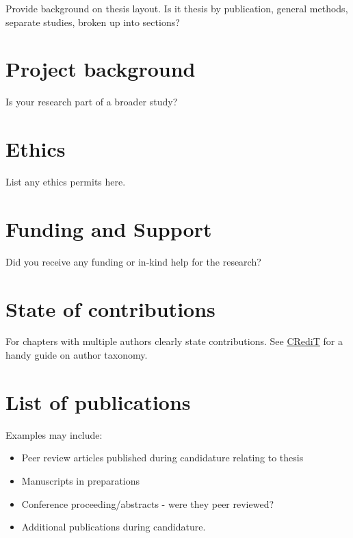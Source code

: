 \documentclass[a4paper, nobind]{templates/ociamthesis}
\providecommand{\tightlist}{%
  \setlength{\itemsep}{0pt}\setlength{\parskip}{0pt}}
\begin{document}
Provide background on thesis layout. Is it thesis by publication, general methods, separate studies, broken up into sections?

\hypertarget{project-background}{%
\section*{Project background}\label{project-background}}

Is your research part of a broader study?

\hypertarget{ethics}{%
\section*{Ethics}\label{ethics}}

List any ethics permits here.

\hypertarget{funding-and-support}{%
\section*{Funding and Support}\label{funding-and-support}}

Did you receive any funding or in-kind help for the research?

\hypertarget{state-of-contributions}{%
\section*{State of contributions}\label{state-of-contributions}}

For chapters with multiple authors clearly state contributions.
See \href{https://www.elsevier.com/authors/policies-and-guidelines/credit-author-statement}{CRediT} for a handy guide on author taxonomy.

\hypertarget{list-of-publications}{%
\section*{List of publications}\label{list-of-publications}}

Examples may include:

\begin{itemize}
\tightlist
\item
  Peer review articles published during candidature relating to thesis
\item
  Manuscripts in preparations
\item
  Conference proceeding/abstracts - were they peer reviewed?
\item
  Additional publications during candidature.
\end{itemize}
\end{document}
